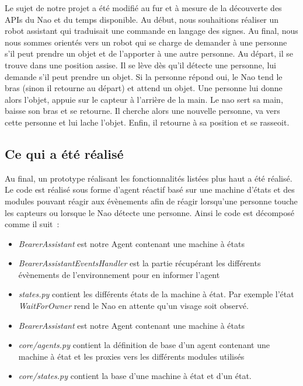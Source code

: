 \documentclass{article}
\begin{document}
Le sujet de notre projet a été modifié au fur et à mesure de la découverte des APIs du Nao et du temps disponible. Au début, nous souhaitions réaliser un robot assistant qui traduisait une commande en langage des signes. Au final, nous nous sommes orientés vers un robot qui se charge de demander à une personne s'il peut prendre un objet et de l'apporter à une autre personne. Au départ, il se trouve dans une position assise. Il se lève dès qu'il détecte une personne, lui demande s'il peut prendre un objet. Si la personne répond oui, le Nao tend le bras (sinon il retourne au départ) et attend un objet. Une personne lui donne alors l'objet, appuie sur le capteur à l'arrière de la main. Le nao sert sa main, baisse son bras et se retourne. Il cherche alors une nouvelle personne, va vers cette personne et lui lache l'objet. Enfin, il retourne à sa position et se rasseoit.

\subsection{Ce qui a été réalisé}

Au final, un prototype réalisant les fonctionnalités listées plus haut a été réalisé. Le code est réalisé sous forme d'agent réactif basé sur une machine d'états et des modules pouvant réagir aux évènements afin de réagir lorsqu'une personne touche les capteurs ou lorsque le Nao détecte une personne. Ainsi le code est décomposé comme il suit~:

\begin{itemize}
	\item \emph{BearerAssistant} est notre Agent contenant une machine à états
	\item \emph{BearerAssistantEventsHandler} est la partie récupérant les différents évènements de l'environnement pour en informer l'agent
	\item \emph{states.py} contient les différents états de la machine à état. Par exemple l'état \emph{WaitForOwner} rend le Nao en attente qu'un visage soit observé.
	\item \emph{BearerAssistant} est notre Agent contenant une machine à états
	\item \emph{core/agents.py} contient la définition de base d'un agent contenant une machine à état et les proxies vers les différents modules utilisés
	\item \emph{core/states.py} contient la base d'une machine à état et d'un état.
\end{itemize}
\end{document}
